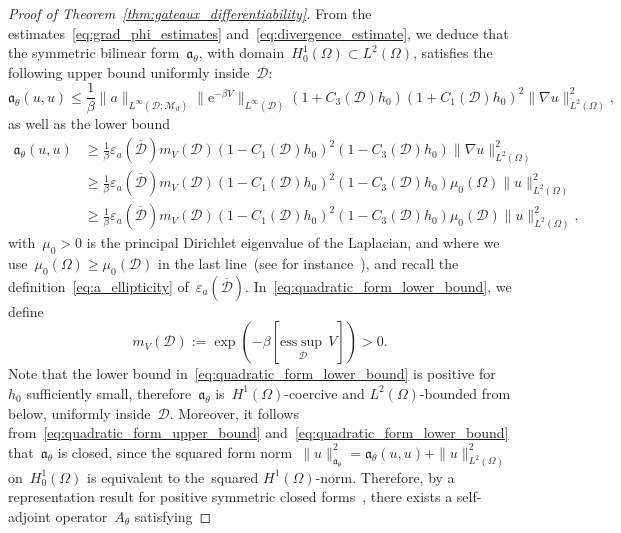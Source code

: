 \documentclass[a4]{article}
\newcommand{\e}{\mathrm{e}}
\newcommand{\fa}{\mathfrak{a}}
\newcommand{\1}{\mathbbm 1}
\begin{document}
\begin{proof}[Proof of Theorem~\ref{thm:gateaux_differentiability}]
    From the estimates~\eqref{eq:grad_phi_estimates} and~\eqref{eq:divergence_estimate}, we deduce that the symmetric bilinear form~$\fa_\theta$, with domain~$H_0^1(\Omega)\subset L^2(\Omega)$, satisfies the following upper bound uniformly inside~$\mathcal D$:
    \begin{equation}
        \label{eq:quadratic_form_upper_bound}
        \fa_\theta(u,u) \leq \frac1\beta\|a\|_{L^\infty\left(\mathcal D;\mathcal M_d\right)}\|\e^{-\beta V}\|_{L^\infty\left(\mathcal D\right)}(1+C_3(\mathcal D) h_0)(1+C_1(\mathcal D)h_0)^2\|\nabla u\|^2_{L^2(\Omega)},
    \end{equation}
     as well as the lower bound
    \begin{equation}
        \label{eq:quadratic_form_lower_bound}
        \begin{aligned}
            \fa_\theta(u,u) &\geq \frac1\beta\varepsilon_a(\overline{\mathcal D}) m_V(\mathcal D) (1-C_1(\mathcal D)h_0)^2(1-C_3(\mathcal D)h_0)\|\nabla u\|_{L^2(\Omega)}^2\\
            &\geq \frac1\beta\varepsilon_a(\overline{\mathcal D}) m_V(\mathcal D) (1-C_1(\mathcal D)h_0)^2(1-C_3(\mathcal D)h_0) \mu_0(\Omega)\|u\|^2_{L^2(\Omega)}\\
            &\geq \frac1\beta\varepsilon_a(\overline{\mathcal D}) m_V(\mathcal D) (1-C_1(\mathcal D)h_0)^2(1-C_3(\mathcal D)h_0) \mu_0(\mathcal D)\|u\|^2_{L^2(\Omega)},
        \end{aligned}
    \end{equation}
    with~$\mu_0>0$ is the principal Dirichlet eigenvalue of the Laplacian, and where we use~$\mu_0(\Omega)\geq \mu_0(\mathcal D)$ in the last line~(see for instance~\cite[Proposition 16]{BLS24}), and recall the definition~\eqref{eq:a_ellipticity} of~$\varepsilon_a(\overline{\mathcal D})$.
    In~\eqref{eq:quadratic_form_lower_bound}, we define
    $$ m_V(\mathcal D) := \exp\left(-\beta \left[\underset{\mathcal D}{\mathrm{ess}\sup}\, V\right]\right)>0.$$
    Note that the lower bound in~\eqref{eq:quadratic_form_lower_bound} is positive for~$h_0$ sufficiently small, therefore~$\fa_{\theta}$ is~$H^1(\Omega)$-coercive and $L^2(\Omega)$-bounded from below, uniformly inside~$\mathcal D$.
    Moreover, it follows from~\eqref{eq:quadratic_form_upper_bound} and~\eqref{eq:quadratic_form_lower_bound} that~$\fa_\theta$ is closed, since the squared form norm~$\|u\|_{\fa_\theta}^2 = \fa_\theta(u,u) + \|u\|^2_{L^2(\Omega)}$ on~$H_0^1(\Omega)$ is equivalent to the~squared $H^1(\Omega)$-norm.
    Therefore, by a representation result for positive symmetric closed forms~\cite[Theorem VI.2.6]{K13}, there exists a self-adjoint operator~$A_\theta$ satisfying

\end{proof}
\end{document}
